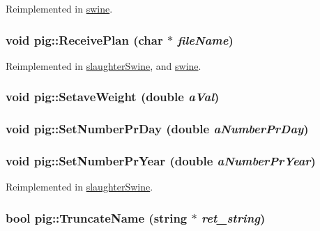 Reimplemented in \hyperlink{classswine_a57668c3c30994f0c3969dcef6d7280db}{swine}.\hypertarget{classpig_a093788c67f8ab28b6e9da95bca443b89}{
\subsubsection[{ReceivePlan}]{\setlength{\rightskip}{0pt plus 5cm}void pig::ReceivePlan (char $\ast$ {\em fileName})}}
\label{classpig_a093788c67f8ab28b6e9da95bca443b89}


Reimplemented in \hyperlink{classslaughter_swine_aeaaac01b283e4bc09d60b4f4bd65c442}{slaughterSwine}, and \hyperlink{classswine_af290612a28b7676522d5ae1f450c44ec}{swine}.\hypertarget{classpig_ab7ee804807152f9528421430af56e740}{
\subsubsection[{SetaveWeight}]{\setlength{\rightskip}{0pt plus 5cm}void pig::SetaveWeight (double {\em aVal})}}
\label{classpig_ab7ee804807152f9528421430af56e740}
\hypertarget{classpig_abfc2a5b80d56f3e886e1e5649f3b9820}{
\subsubsection[{SetNumberPrDay}]{\setlength{\rightskip}{0pt plus 5cm}void pig::SetNumberPrDay (double {\em aNumberPrDay})}}
\label{classpig_abfc2a5b80d56f3e886e1e5649f3b9820}
\hypertarget{classpig_a5ada344ee9223275a5dec61f71ce7bb4}{
\subsubsection[{SetNumberPrYear}]{\setlength{\rightskip}{0pt plus 5cm}void pig::SetNumberPrYear (double {\em aNumberPrYear})}}
\label{classpig_a5ada344ee9223275a5dec61f71ce7bb4}


Reimplemented in \hyperlink{classslaughter_swine_a5d9ea11f9aaf40490cdd27baceb91e91}{slaughterSwine}.\hypertarget{classpig_ad9d9dc4d357e5cf07350b1681e67eca5}{
\subsubsection[{TruncateName}]{\setlength{\rightskip}{0pt plus 5cm}bool pig::TruncateName (string $\ast$ {\em ret\_\-string})}}
\label{classpig_ad9d9dc4d357e5cf07350b1681e67eca5}


